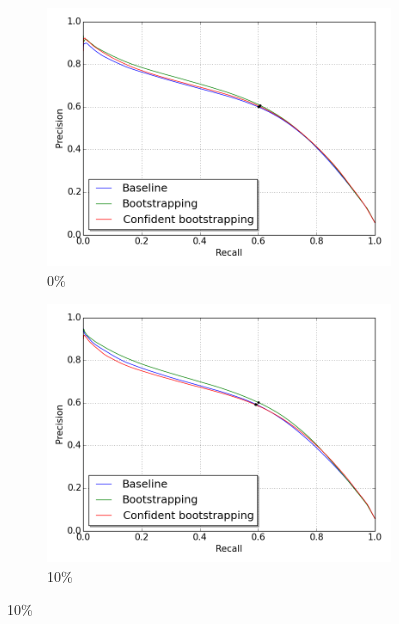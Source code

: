 \begin{figure}[H]
\begin{subfigure}{0.31\textwidth}
\includegraphics[width=\textwidth]{figs/E2/pr_0.png}
\caption{ 0\% } \label{fig:app_E2_0_pr}
\vspace{-0.1cm} %
\end{subfigure}
\hspace*{\fill} %
\begin{subfigure}{0.31\textwidth}
\includegraphics[width=\textwidth]{figs/E2/pr_1.png}
\caption{10\% } \label{fig:app_E2_1_pr}
\vspace{-0.1cm} %

\end{subfigure}
\end{figure}
